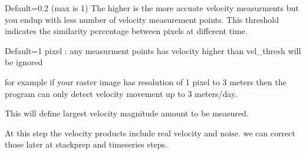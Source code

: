 \documentclass[letterpaper,10pt]{sphinxmanual}
\begin{document}
\sphinxAtStartPar
{}

\sphinxAtStartPar
{}

\sphinxAtStartPar
Default=0.2 (max is 1) The higher is the more accuate velocity measurments  but you endup with less number of velocity measurement points. This threshold indicates the similarity percentage between pixels at different time.

\sphinxAtStartPar
{}

\sphinxAtStartPar
Default=1 pixel : any measurment points has velocity higher than vel\_thresh will be ignored

\sphinxAtStartPar
for example if your raster image has resolution of 1 pixel to 3 meters then the program can only detect velocity movement up to 3 meters/day.

\sphinxAtStartPar
This will define largest velocity magnitude amount to be measured.

\sphinxAtStartPar
\sphinxhyphen{}At this step the velocity products include real velocity and noise. we can correct those later at stackprep and timeseries steps.

\begin{sphinxVerbatim}[commandchars=\\\{\}]

   
   
     
\end{sphinxVerbatim}
\end{document}
